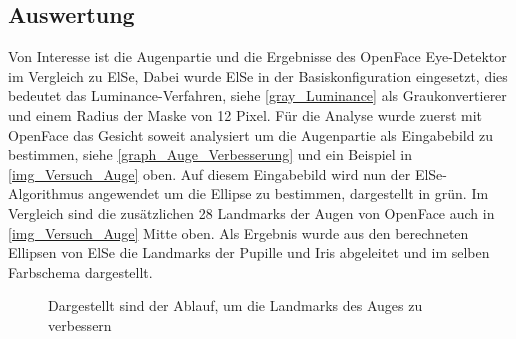\subsection{Auswertung}
Von Interesse ist die Augenpartie und die Ergebnisse des OpenFace Eye-Detektor im Vergleich zu ElSe, Dabei wurde ElSe in der Basiskonfiguration eingesetzt, dies bedeutet das Luminance-Verfahren, siehe \autoref{gray_Luminance} als Graukonvertierer und einem Radius der Maske von 12 Pixel.
Für die Analyse wurde zuerst mit OpenFace das Gesicht soweit analysiert um die Augenpartie als Eingabebild zu bestimmen, siehe \autoref{graph_Auge_Verbesserung} und ein Beispiel in \autoref{img_Versuch_Auge} oben. Auf diesem Eingabebild wird nun der ElSe-Algorithmus angewendet um die Ellipse zu bestimmen, dargestellt in grün. Im Vergleich sind die zusätzlichen 28 Landmarks der Augen von OpenFace auch in \autoref{img_Versuch_Auge} Mitte oben. Als Ergebnis wurde aus den berechneten Ellipsen von ElSe die Landmarks der Pupille und Iris abgeleitet und im selben Farbschema dargestellt.
\begin{figure}
	\centering
	
	\caption{Dargestellt sind der Ablauf, um die Landmarks des Auges zu verbessern}
	\label{graph_Auge_Verbesserung}
\end{figure}
